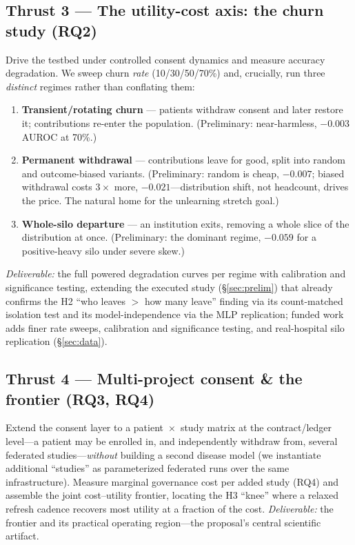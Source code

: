 \documentclass[11pt]{article}
\begin{document}
\subsection{Thrust 3 --- The utility-cost axis: the churn study (RQ2)}
Drive the testbed under controlled consent dynamics and measure accuracy
degradation. We sweep churn \emph{rate} (10/30/50/70\%) and, crucially, run three
\emph{distinct} regimes rather than conflating them:
\begin{enumerate}
\item \textbf{Transient/rotating churn} --- patients withdraw consent and later
restore it; contributions re-enter the population. (Preliminary: near-harmless,
$-0.003$ AUROC at 70\%.)
\item \textbf{Permanent withdrawal} --- contributions leave for good, split into
random and outcome-biased variants. (Preliminary: random is cheap, $-0.007$;
biased withdrawal costs $3\times$ more, $-0.021$---distribution shift, not
headcount, drives the price. The natural home for the unlearning stretch goal.)
\item \textbf{Whole-silo departure} --- an institution exits, removing a whole
slice of the distribution at once. (Preliminary: the dominant regime, $-0.059$
for a positive-heavy silo under severe skew.)
\end{enumerate}
\emph{Deliverable:} the full powered degradation curves per regime with
calibration and significance testing, extending the executed study
(\S\ref{sec:prelim}) that already confirms the H2 ``who leaves $>$ how many
leave'' finding via its count-matched isolation test and its model-independence
via the MLP replication; funded work adds finer rate sweeps, calibration and
significance testing, and real-hospital silo replication (\S\ref{sec:data}).

\subsection{Thrust 4 --- Multi-project consent \& the frontier (RQ3, RQ4)}
Extend the consent layer to a patient~$\times$~study matrix at the
contract/ledger level---a patient may be enrolled in, and independently withdraw
from, several federated studies---\emph{without} building a second disease model
(we instantiate additional ``studies'' as parameterized federated runs over the
same infrastructure). Measure marginal governance cost per added study (RQ4) and
assemble the joint cost--utility frontier, locating the H3 ``knee'' where a
relaxed refresh cadence recovers most utility at a fraction of the cost.
\emph{Deliverable:} the frontier and its practical operating region---the
proposal's central scientific artifact.
\end{document}
